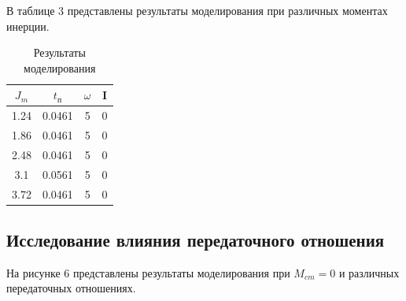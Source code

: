 \documentclass[a4paper, 11pt]{article}
\begin{document}
\par 
В таблице 3 представлены результаты моделирования при различных моментах инерции.
\newpage
\begin{table}[h!]
\centering
	\begin{threeparttable}
	\caption{Результаты моделирования}\label{tab:perflogcross}
		\begin{tabular}{|c|c|c|c|}
			\hline
			$J_m$ & $t_\text{п}$ & $\omega$ & I\\
			\hline
			1.24 & 0.0461 & 5 & 0\\
			\hline
			1.86 & 0.0461 & 5 & 0\\
			\hline
			2.48 & 0.0461 & 5 & 0\\
			\hline
			3.1 & 0.0561 & 5 & 0\\
			\hline
			3.72 & 0.0461 & 5 & 0\\
			\hline
		\end{tabular}
	\end{threeparttable}
\end{table}

\newpage
\begin{center}
	\section{Исследование влияния передаточного отношения}
\end{center}
\par
На рисунке 6 представлены результаты моделирования при $M_{cm} = 0$ и различных передаточных отношениях.
\end{document}

